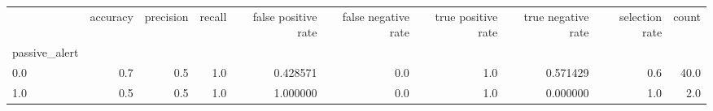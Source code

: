 \begin{tabular}{lrrrrrrrrr}
\toprule
{} &  accuracy &  precision &  recall &  false positive rate &  false negative rate &  true positive rate &  true negative rate &  selection rate &  count \\
passive\_alert &           &            &         &                      &                      &                     &                     &                 &        \\
\midrule
0.0           &       0.7 &        0.5 &     1.0 &             0.428571 &                  0.0 &                 1.0 &            0.571429 &             0.6 &   40.0 \\
1.0           &       0.5 &        0.5 &     1.0 &             1.000000 &                  0.0 &                 1.0 &            0.000000 &             1.0 &    2.0 \\
\bottomrule
\end{tabular}
